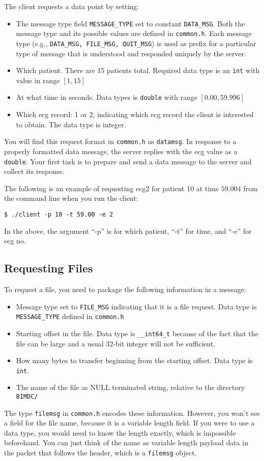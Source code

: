 \documentclass[12pt]{article}
\begin{document}
The client requests a data point by setting:
\begin{itemize}
	\item The message type field \texttt{MESSAGE\_TYPE} set to constant \texttt{DATA\_MSG}. Both the message type and its possible values are defined in \texttt{common.h}. Each message type (e.g., \texttt{DATA\_MSG, FILE\_MSG, QUIT\_MSG}) is used as prefix for a particular type of message that is understood and responded uniquely by the server.  
	\item Which patient. There are 15 patients total. Required data type is an \texttt{int} with value in range $[1,15]$
	\item At what time in seconds. Data types is \texttt{double} with range $[0.00, 59.996]$
	\item Which ecg record: 1 or 2, indicating which ecg record the client is interested to obtain. The data type is integer.
\end{itemize}
You will find this request format in \texttt{common.h} as \texttt{datamsg}. In response to a properly formatted data message, the server replies with the ecg value as a \texttt{double}. Your first task is to prepare and send a data message to the server and collect its response. 

The following is an example of requesting ecg2 for patient 10 at time $59.004$ from the command line when you run the client:
\begin{lstlisting}[style=bash]
	$ ./client -p 10 -t 59.00 -e 2
  \end{lstlisting}

In the above, the argument ``-p'' is for which patient, ``-t'' for time, and ``-e'' for ecg no.

\subsection*{Requesting Files}
To request a file, you need to package the following information in a message:
\begin{itemize}
	\item Message type set to \texttt{FILE\_MSG} indicating that it is a file request. Data type is \texttt{MESSAGE\_TYPE} defined in \texttt{common.h}
	\item Starting offset in the file. Data type is \texttt{\_\_int64\_t} because of the fact that the file can be large and a usual 32-bit integer will not be sufficient.
	\item How many bytes to transfer beginning from the starting offset. Data type is \texttt{int}. 
	\item The name of the file as NULL terminated string, relative to the directory \texttt{BIMDC/}
\end{itemize}
The type \texttt{filemsg} in \texttt{common.h} encodes these information. However, you won't see a field for the file name, because it is a variable length field. If you were to use a data type, you would need to know the length exactly, which is impossible beforehand. You can just think of the name as variable length payload data in the packet that follows the header, which is a \texttt{filemsg} object. 
\end{document}
